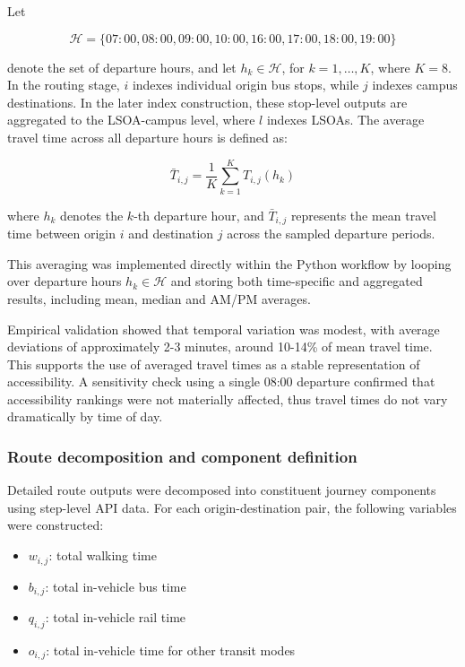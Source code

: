 \documentclass[11pt,a4paper]{article}
\begin{document}
Let

\[
\mathcal{H} = \{07{:}00, 08{:}00, 09{:}00, 10{:}00, 16{:}00, 17{:}00, 18{:}00, 19{:}00\}
\]

denote the set of departure hours, and let \(h_k \in \mathcal{H}\), for \(k = 1,\ldots,K\), where \(K = 8\). In the routing stage, \(i\) indexes individual origin bus stops, while \(j\) indexes campus destinations. In the later index construction, these stop-level outputs are aggregated to the LSOA-campus level, where \(l\) indexes LSOAs. The average travel time across all departure hours is defined as:

\[
\bar{T}_{i,j} = \frac{1}{K}\sum_{k=1}^{K} T_{i,j}(h_k)
\]

where \(h_k\) denotes the \(k\)-th departure hour, and \(\bar{T}_{i,j}\) represents the mean travel time between origin \(i\) and destination \(j\) across the sampled departure periods.

This averaging was implemented directly within the Python workflow by looping over departure hours \(h_k \in \mathcal{H}\) and storing both time-specific and aggregated results, including mean, median and AM/PM averages.

Empirical validation showed that temporal variation was modest, with average deviations of approximately 2-3 minutes, around 10-14\% of mean travel time. This supports the use of averaged travel times as a stable representation of accessibility. A sensitivity check using a single 08:00 departure confirmed that accessibility rankings were not materially affected, thus travel times do not vary dramatically by time of day.

\subsubsection{Route decomposition and component definition}

Detailed route outputs were decomposed into constituent journey components using step-level API data. For each origin-destination pair, the following variables were constructed:

\begin{itemize}
    \item \(w_{i,j}\): total walking time
    \item \(b_{i,j}\): total in-vehicle bus time
    \item \(q_{i,j}\): total in-vehicle rail time
    \item \(o_{i,j}\): total in-vehicle time for other transit modes
\end{itemize}
\end{document}
